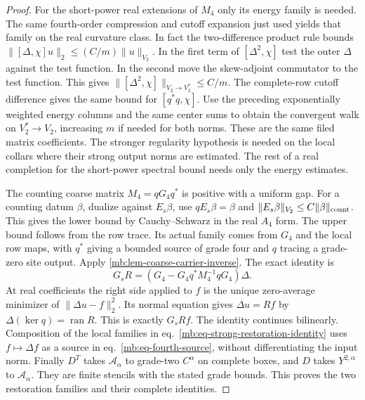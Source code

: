 \documentclass[11pt,letterpaper,reqno]{amsart}
\numberwithin{equation}{section}
\renewcommand{\eqref}[1]{\textup{eq.~\ref{#1}}}
\theoremstyle{definition}
\theoremstyle{remark}
\begin{document}
\begin{proof}
For the short-power real extensions of \(M_4\) only its energy
family is needed. The same fourth-order compression and cutoff
expansion just used yields that family on the real curvature class.
In fact the two-difference product rule bounds
\(\|[\Delta,\chi]u\|_2\le (C/m)\|u\|_{V_2}\).
In the first term of \([\Delta^2,\chi]\) test the outer
\(\Delta\) against the test function. In the second move the
skew-adjoint commutator to the test function. This gives
\(\|[\Delta^2,\chi]\|_{V_2\to V_2^*}\le C/m\).
The complete-row cutoff difference gives the same bound for
\([q^*q,\chi]\). Use the preceding exponentially weighted
energy columns and the same center sums to obtain the convergent
walk on \(V_2^*\to V_2\), increasing \(m\) if needed for both
norms. These are the same filed matrix coefficients. The stronger
regularity hypothesis is needed on the local collars where their
strong output norms are estimated. The rest of a real completion
for the short-power spectral bound needs only the energy estimates.

The counting coarse matrix \(M_4=qG_4q^*\) is positive with a uniform gap. For a counting datum \(\beta\), dualize against \(E_s\beta\), use \(qE_s\beta=\beta\) and \(\|E_s\beta\|_{V_2}\le C\|\beta\|_{\rm count}\). This gives the lower bound by Cauchy--Schwarz in the real \(A_4\) form. The upper bound follows from the row trace. Its actual family comes from \(G_4\) and the local row maps, with \(q^*\) giving a bounded source of grade four and \(q\) tracing a grade-zero site output. Apply \cref{mb:lem-coarse-carrier-inverse}. The exact identity is
\begin{equation}\label{mb:eq-strong-restoration-identity}
        G_sR=(G_4-G_4q^*M_4^{-1}qG_4)\Delta .
\end{equation}
At real coefficients the right side applied to \(f\) is the unique zero-average minimizer of \(\|\Delta u-f\|_2^2\). Its normal equation gives \(\Delta u=Rf\) by \(\Delta(\ker q)=\operatorname{ran}R\). This is exactly \(G_sRf\). The identity continues bilinearly. Composition of the local families in \eqref{mb:eq-strong-restoration-identity} uses \(f\mapsto\Delta f\) as a source in \eqref{mb:eq-fourth-source}, without differentiating the input norm. Finally \(D^T\) takes \(\mathcal A_\alpha\) to grade-two \(C^\alpha\) on complete boxes, and \(D\) takes \(Y^{2,\alpha}\) to \(\mathcal A_\alpha\). They are finite stencils with the stated grade bounds. This proves the two restoration families and their complete identities.
\end{proof}
\end{document}
